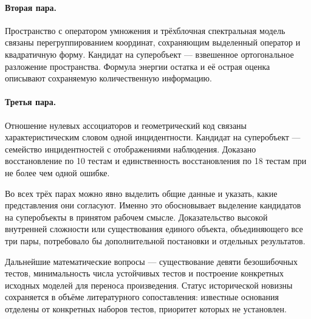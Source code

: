 \documentclass[11pt,a4paper]{article}
\numberwithin{equation}{section}
\theoremstyle{definition}
\theoremstyle{remark}
\begin{document}
\paragraph{Вторая пара.}
Пространство с оператором умножения и трёхблочная спектральная модель
связаны перегруппированием координат, сохраняющим выделенный оператор
и квадратичную форму. Кандидат на суперобъект --- взвешенное
ортогональное разложение пространства. Формула энергии остатка
и её острая оценка описывают сохраняемую количественную информацию.

\paragraph{Третья пара.}
Отношение нулевых ассоциаторов и геометрический код связаны
характеристическим словом одной инцидентности. Кандидат на суперобъект
--- семейство инцидентностей с отображениями наблюдения.
Доказано восстановление по 10 тестам и единственность восстановления
по 18 тестам при не более чем одной ошибке.

Во всех трёх парах можно явно выделить общие данные и указать,
какие представления они согласуют. Именно это обосновывает
выделение кандидатов на суперобъекты в принятом рабочем смысле.
Доказательство высокой внутренней сложности или существования
единого объекта, объединяющего все три пары, потребовало бы
дополнительной постановки и отдельных результатов.

Дальнейшие математические вопросы --- существование девяти
безошибочных тестов, минимальность числа устойчивых тестов и
построение конкретных исходных моделей для переноса произведения.
Статус исторической новизны сохраняется в объёме литературного
сопоставления: известные основания отделены от конкретных наборов
тестов, приоритет которых не установлен.

\appendix
\end{document}
